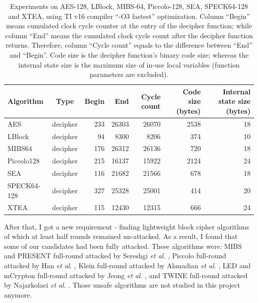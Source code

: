 \documentclass[sigconf, review=false]{acmart}
\begin{document}
\begin{table}[tbp]
\centering
\caption{Experiments on AES-128, LBlock, MIBS-64, Piccolo-128, SEA, SPECK64-128 and XTEA,
using TI v16 compiler ``-O3 fastest'' optimization.
Column ``Begin'' means cumulated clock cycle counter at the entry of the decipher function;
while column ``End'' means the cumulated clock cycle count after the decipher function returns.
Therefore, column ``Cycle count'' equals to the difference between ``End'' and ``Begin''.
Code size is the decipher function's binary code size;
whereas the internal state size is the maximum size of in-use local variables (function parameters are excluded).}
\label{tab-beg}
\begin{tabular}{lcrrrrr}
    \toprule
Algorithm   & Type     & Begin & End   & Cycle count & Code size (bytes) & Internal state size (bytes) \\
    \midrule
AES         & decipher & 233   & 26303 & 26070       & 2538              & 18                          \\
LBlock      & decipher & 94    & 8300  & 8206        & 374               & 10                          \\
MIBS64      & decipher & 176   & 26312 & 26136       & 720               & 18                          \\
Piccolo128  & decipher & 215   & 16137 & 15922       & 2124              & 24                          \\
SEA         & decipher & 116   & 21682 & 21566       & 678               & 18                          \\
SPECK64-128 & decipher & 327   & 25328 & 25001       & 414               & 20                          \\
XTEA        & decipher & 115   & 12430 & 12315       & 666               & 24                          \\
    \bottomrule
\end{tabular}
\end{table}

After that, I got a new requirement - finding lightweight block cipher algorithms of which at least half rounds remained un-attacked.
As a result, I found that some of our candidates had been fully attacked.
These algorithms were: MIBS and PRESENT \cite{bogdanov2007present} full-round attacked by Sereshgi \textit{et al.} \cite{sereshgi2016biclique},
Piccolo full-round attacked by Han \textit{et al.} \cite{han2017improved}, Klein \cite{gong2011klein} full-round attacked by Ahmadian \textit{et al.} \cite{ahmadian2015biclique},
LED \cite{Guo:2011:LBC:2044928.2044958} and mCrypton \cite{lim2005mcrypton} full-round attacked by Jeong \textit{et al.} \cite{jeong2015weakness},
and TWINE \cite{suzaki2012twine} full-round attacked by Najarkolaei \textit{et al.} \cite{najarkolaei2016biclique}.
Those unsafe algorithms are not studied in this project anymore.
\end{document}

